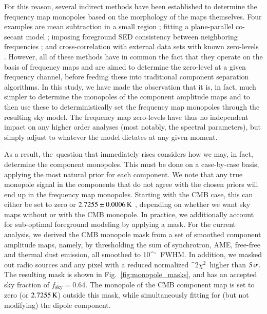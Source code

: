 \documentclass{aa}
\def\,{\thinspace}
\def\deg{\ifmmode^\circ\else$^\circ$\fi}
\def\chisq{\ifmmode \chi^2\else $\chi^2$\fi}
\begin{document}
For this reason, several indirect methods have been established to
determine the frequency map monopoles based on the morphology of the
maps themselves. Four examples are mean subtraction in a small region
\citep{planck2013-p02b}; fitting a plane-parallel co-secant model
\citep{bennett2003b,planck2014-a03}; imposing foreground SED
consistency between neighboring frequencies \citep{wehus2014}; and
cross-correlation with external data sets with known zero-levels
\citep{planck2014-a09}. However, all of these methods have in common
the fact that they operate on the basis of frequency maps and are aimed to
determine the zero-level at a given frequency channel, before feeding
these into traditional component separation algorithms. In this study,
we have made the observation that it is, in fact, much simpler
to determine the monopoles of the component amplitude maps and
to then use these to deterministically set the frequency map monopoles
through the resulting sky model. The frequency map zero-levels have
thus no independent impact on any higher order analyses (most notably,
the spectral parameters), but simply adjust to whatever the
model dictates at any given moment.

As a result, the\ question that immediately rises considers how we may, in fact, determine
the component monopoles. This must be done on a case-by-case basis,
applying the most natural prior for each component.
We note that any true monopole signal in the components that
do not agree with the chosen priors will end up in the frequency
map monopoles.
Starting with the CMB case, this can either be set to zero or
$2.7255\pm0.0006\,\mathrm{K}$ \citep{fixsen2009}, depending on whether
we want sky maps without or with the CMB monopole. In practice, we
additionally account for sub-optimal foreground modeling by applying a
mask. For the current analysis, we derived the CMB monopole mask from a
set of smoothed component amplitude maps, namely, by thresholding the
sum of synchrotron, AME, free-free and thermal dust emission, all
smoothed to 10\deg\ FWHM. In addition, we masked out radio sources and
any pixel with a reduced normalized \chisq\ higher than
$5\,\sigma$. The resulting mask is shown in
Fig.~\ref{fig:monopole_masks}, and has an accepted sky fraction of
$f_{\mathrm{sky}}=0.64$. The monopole of the CMB component map is set
to zero (or $2.7255\,\mathrm{K}$) outside this mask,
while simultaneously fitting for (but not
modifying) the dipole component.
\end{document}
